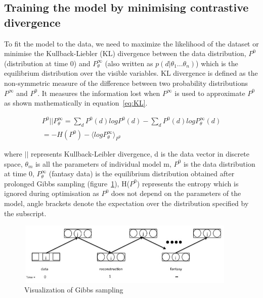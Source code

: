 \documentclass{acm_proc_article-sp}
\begin{document}
\subsection{Training the model by minimising contrastive divergence}
To fit the model to the data, we need to maximize the likelihood of the dataset or minimise the Kullback-Liebler (KL) divergence between the data distribution, $P^0$ (distribution at time 0) and $P^\infty_\theta$ (also written as $p(d|\theta_{1}...\theta_{n})$) which is
the equilibrium distribution over the visible variables. KL divergence is defined as the non-symmetric measure of the difference between two probability distributions $P^\infty$ and $P^0$. It measures the information lost when $P^\infty$ is used to approximate $P^{0}$ as shown mathematically in equation~\ref{eq:KL}.

\begin{eqnarray}
P^0 || P^\infty_\theta =  \sum_{d}P^0 (d)logP^0(d) - \sum_{d}P^0 (d)logP^\infty_\theta(d)  \label{eq:KL} \\
 = \nonumber -H(P^0) - \langle log P^\infty_\theta \rangle_{P^{0}}
\end{eqnarray}

where $||$ represents Kullback-Leibler divergence, d is the data vector in discrete space, $\theta_m$ is all the parameters of individual model m, $P^0$ is the data distribution at time $0$, $P^\infty_\theta$ (fantasy data) is the equilibrium distribution obtained after prolonged Gibbs sampling (figure~\ref{fig:gibbs}), H($P^0$) represents the entropy which is ignored during optimisation as $P^0$ does not depend on the parameters of the model, angle brackets denote the expectation over the distribution specified by the subscript. \\

 \begin{figure}[t]
\centering
\includegraphics[width=10.5cm,height=3cm]{gibbs.jpg}
\caption{Visualization of Gibbs sampling}
\label{fig:gibbs}
\end{figure}
\end{document}
